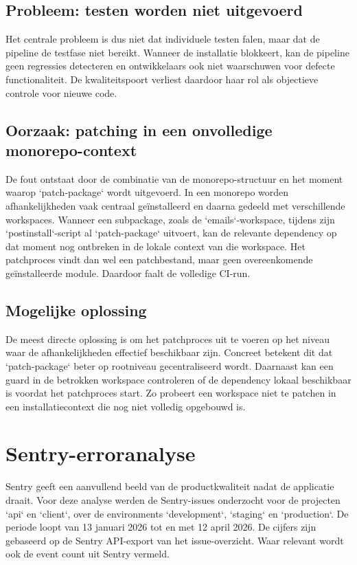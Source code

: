 \subsection{Probleem: testen worden niet uitgevoerd}

Het centrale probleem is dus niet dat individuele testen falen, maar dat de pipeline de testfase niet bereikt. Wanneer de installatie blokkeert, kan de pipeline geen regressies detecteren en ontwikkelaars ook niet waarschuwen voor defecte functionaliteit. De kwaliteitspoort verliest daardoor haar rol als objectieve controle voor nieuwe code.

\subsection{Oorzaak: patching in een onvolledige monorepo-context}

De fout ontstaat door de combinatie van de monorepo-structuur en het moment waarop `patch-package` wordt uitgevoerd. In een monorepo worden afhankelijkheden vaak centraal geïnstalleerd en daarna gedeeld met verschillende workspaces. Wanneer een subpackage, zoals de `emails`-workspace, tijdens zijn `postinstall`-script al `patch-package` uitvoert, kan de relevante dependency op dat moment nog ontbreken in de lokale context van die workspace. Het patchproces vindt dan wel een patchbestand, maar geen overeenkomende geïnstalleerde module. Daardoor faalt de volledige CI-run.

\subsection{Mogelijke oplossing}

De meest directe oplossing is om het patchproces uit te voeren op het niveau waar de afhankelijkheden effectief beschikbaar zijn. Concreet betekent dit dat `patch-package` beter op rootniveau gecentraliseerd wordt. Daarnaast kan een guard in de betrokken workspace controleren of de dependency lokaal beschikbaar is voordat het patchproces start. Zo probeert een workspace niet te patchen in een installatiecontext die nog niet volledig opgebouwd is.

\section{Sentry-erroranalyse}

Sentry geeft een aanvullend beeld van de productkwaliteit nadat de applicatie draait. Voor deze analyse werden de Sentry-issues onderzocht voor de projecten `api` en `client`, over de environments `development`, `staging` en `production`. De periode loopt van 13 januari 2026 tot en met 12 april 2026. De cijfers zijn gebaseerd op de Sentry API-export van het issue-overzicht. Waar relevant wordt ook de event count uit Sentry vermeld.

